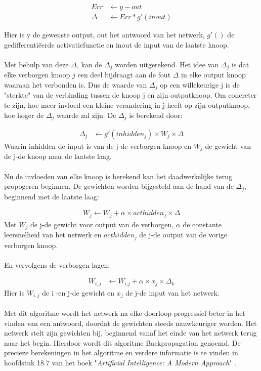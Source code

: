 \documentclass[10pt]{article}
\begin{document}
\begin{align*}
    Err & \leftarrow y - out \\
    \Delta & \leftarrow Err * g'(inout)
\end{align*}

Hier is y de gewenste output, out het antwoord van het netwerk, $g'()$ de gedifferenti\"eerde activatiefunctie en inout de input van de laatste knoop.
\\\\
Met behulp van deze $\Delta$, kan de $\Delta_j$ worden uitgerekend. Het idee van $\Delta_j$ is dat elke verborgen knoop $j$ een deel bijdraagt aan de fout $\Delta$ in elke output knoop waaraan het verbonden is. Dus de waarde van $\Delta_j$ op een willekeurige j is de "sterkte" van de verbinding tussen de knoop j en zijn outputknoop. Om concreter te zijn, hoe meer invloed een kleine verandering in j heeft op zijn outputknoop, hoe hoger de $\Delta_j$ waarde zal zijn. De $\Delta_j$ is berekend door:

\begin{align*}
    \Delta_j & \leftarrow g'(inhidden_j) \times W_j \times \Delta
\end{align*}
Waarin inhidden de input is van de j-de verborgen knoop en $W_j$ de gewicht van de j-de knoop naar de laatste laag.
\\\\
Nu de invloeden van elke knoop is berekend kan het daadwerkelijke terug propogeren beginnen.
De gewichten worden bijgesteld aan de hand van de $\Delta_j$, beginnend met de laatste laag:

\begin{align*}
    W_j \leftarrow W_j + \alpha \times acthidden_j \times \Delta
\end{align*}
Met $W_j$ de j-de gewicht voor output van de verborgen, $\alpha$ de constante leersnelheid van het netwerk en $acthidden_j$ de j-de output van de vorige verborgen knoop.
\\\\
En vervolgens de verborgen lagen:

\begin{align*}
    W_{i,j} & \leftarrow W_{i.j} + \alpha \times x_j \times \Delta_k
\end{align*}
Hier is $W_{i,j}$ de i -en j-de gewicht en $x_j$ de j-de input van het netwerk.
\\\\
Met dit algoritme wordt het netwerk na elke doorloop progressief beter in het vinden van een antwoord, doordat de gewichten steeds nauwkeuriger worden. Het netwerk stelt zijn gewichten bij, beginnend vanaf het einde van het netwerk terug naar het begin. Hierdoor wordt dit algoritme Backpropagation genoemd. De precieze berekeningen in het algoritme en verdere informatie is te vinden in hoofdstuk 18.7 van het boek "\textit{Artificial Intelligence: A Modern Approach}" \cite{chapter}.
\end{document}
